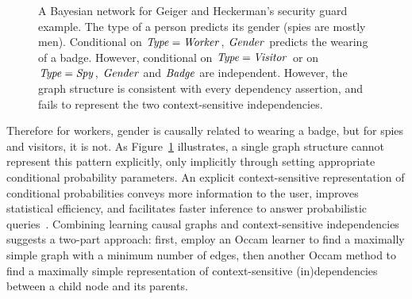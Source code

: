 \documentclass{elsarticle}%
\begin{document}
 
\begin{figure}[htbp]
\centering
{}
\caption{A Bayesian network for Geiger and Heckerman's security guard example. The type of a person predicts its gender (spies are mostly men). Conditional on $\it{Type = Worker}$, $\it{Gender}$ predicts the wearing of a badge. However, conditional on $\it{Type = Visitor}$ or on $\it{Type = Spy}$, $\it{Gender}$ and $\it{Badge}$ are independent. However, the graph structure is consistent with every dependency assertion, and fails to represent the two context-sensitive independencies.}%
\label{fig:geiger-bn}%
\end{figure}



Therefore for workers, gender is causally related to wearing a badge, but for spies and visitors, it is not. As Figure~\ref{fig:geiger-bn} illustrates, a single graph structure cannot represent this pattern explicitly, only implicitly through setting appropriate conditional probability parameters. An explicit context-sensitive representation of conditional probabilities conveys more information to the user, improves statistical efficiency, and facilitates faster inference to answer probabilistic queries~\cite{Boutilier1996,friedman98:_learn_bayes,Boutilier1999}.  %
Combining learning causal graphs and context-sensitive independencies suggests a two-part approach: first, employ an Occam learner to find a maximally simple graph with a minimum number of edges, then another Occam method to find a maximally simple representation of context-sensitive (in)dependencies between a child node and its parents.
\end{document}
